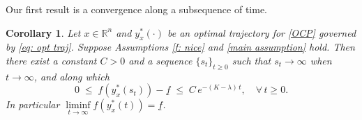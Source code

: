 \documentclass[12pt]{amsart}
\numberwithin{equation}{section}
\theoremstyle{plain}
\newtheorem{corollary}[theorem]{Corollary}
\begin{document}
Our first result is a convergence along a subsequence of time. 

\begin{corollary}\label{cor: vertical 1}
Let $x\in \mathbb{R}^{n}$ and  $y_{x}^{*}(\cdot)$ be an optimal trajectory for \eqref{OCP} governed by \eqref{eq: opt traj}. 
Suppose Assumptions \ref{f: nice} and \ref{main assumption} hold. Then there exist a constant $C>0$ and a sequence $\{s_t\}_{t\geq 0}$ such that $s_t\to \infty$ when $t\to \infty$, and along which  \begin{equation*}
    0 \; \leq \; f(y_{x}^{*}(s_t)) - \underline{f} \; \leq \; C\, e^{-(K-\lambda)\,t}, \quad \forall\,t\geq 0.  
\end{equation*}
 In particular  $\liminf\limits_{t\to \infty} f(y_{x}^{*}(t)) = \underline{f}$. 
\end{corollary}
\end{document}
